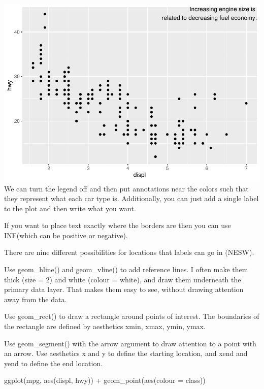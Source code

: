 \documentclass[
]{article}
\newenvironment{Shaded}{\begin{snugshade}}{\end{snugshade}}
\newcommand{\AttributeTok}[1]{\textcolor[rgb]{0.77,0.63,0.00}{#1}}
\newcommand{\FunctionTok}[1]{\textcolor[rgb]{0.00,0.00,0.00}{#1}}
\newcommand{\NormalTok}[1]{#1}
\newcommand{\SpecialCharTok}[1]{\textcolor[rgb]{0.00,0.00,0.00}{#1}}
\begin{document}
\includegraphics{Journal_files/figure-latex/unnamed-chunk-59-3.pdf} We
can turn the legend off and then put annotations near the colors such
that they represent what each car type is. Additionally, you can just
add a single label to the plot and then write what you want.

If you want to place text exactly where the borders are then you can use
INF(which can be positive or negative).

There are nine different possibilities for locations that labels can go
in (NESW).

Use geom\_hline() and geom\_vline() to add reference lines. I often make
them thick (size = 2) and white (colour = white), and draw them
underneath the primary data layer. That makes them easy to see, without
drawing attention away from the data.

Use geom\_rect() to draw a rectangle around points of interest. The
boundaries of the rectangle are defined by aesthetics xmin, xmax, ymin,
ymax.

Use geom\_segment() with the arrow argument to draw attention to a point
with an arrow. Use aesthetics x and y to define the starting location,
and xend and yend to define the end location.

\begin{Shaded}
\begin{Highlighting}[]
\FunctionTok{ggplot}\NormalTok{(mpg, }\FunctionTok{aes}\NormalTok{(displ, hwy)) }\SpecialCharTok{+}
  \FunctionTok{geom\_point}\NormalTok{(}\FunctionTok{aes}\NormalTok{(}\AttributeTok{colour =}\NormalTok{ class))}
\end{Highlighting}
\end{Shaded}
\end{document}
